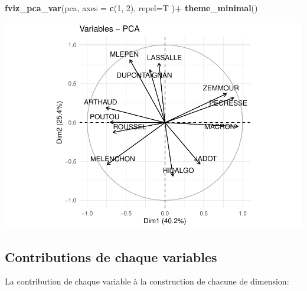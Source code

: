 \documentclass[
]{book}
\newenvironment{Shaded}{\begin{snugshade}}{\end{snugshade}}
\newcommand{\AttributeTok}[1]{\textcolor[rgb]{0.13,0.29,0.53}{#1}}
\newcommand{\DecValTok}[1]{\textcolor[rgb]{0.00,0.00,0.81}{#1}}
\newcommand{\FunctionTok}[1]{\textcolor[rgb]{0.13,0.29,0.53}{\textbf{#1}}}
\newcommand{\NormalTok}[1]{#1}
\newcommand{\SpecialCharTok}[1]{\textcolor[rgb]{0.81,0.36,0.00}{\textbf{#1}}}
\begin{document}
\begin{Shaded}
\begin{Highlighting}[]
\FunctionTok{fviz\_pca\_var}\NormalTok{(pca,  }\AttributeTok{axes =} \FunctionTok{c}\NormalTok{(}\DecValTok{1}\NormalTok{, }\DecValTok{2}\NormalTok{), }\AttributeTok{repel=}\NormalTok{T )}\SpecialCharTok{+}  \FunctionTok{theme\_minimal}\NormalTok{()}
\end{Highlighting}
\end{Shaded}

\includegraphics{bookdown-demo_files/figure-latex/unnamed-chunk-67-1.pdf}

\hypertarget{contributions-de-chaque-variables}{%
\subsection{Contributions de chaque variables}\label{contributions-de-chaque-variables}}

La contribution de chaque variable à la construction de chacune de dimension:

\begin{Shaded}
\end{Shaded}
\end{document}
